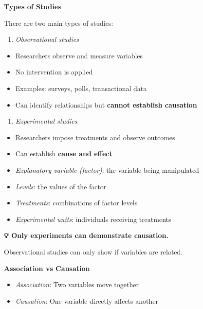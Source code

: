 \documentclass[
  11pt,
  oneside]{scrbook}
\providecommand{\tightlist}{%
  \setlength{\itemsep}{0pt}\setlength{\parskip}{0pt}}
\begin{document}
\textbf{Types of Studies}

There are two main types of studies:

\begin{enumerate}
\def\labelenumi{\arabic{enumi}.}
\tightlist
\item
  \emph{Observational studies}
\end{enumerate}

\begin{itemize}
\tightlist
\item
  Researchers observe and measure variables
\item
  No intervention is applied
\item
  Examples: surveys, polls, transactional data
\item
  Can identify relationships but \textbf{cannot establish causation}
\end{itemize}

\begin{enumerate}
\def\labelenumi{\arabic{enumi}.}
\setcounter{enumi}{1}
\tightlist
\item
  \emph{Experimental studies}
\end{enumerate}

\begin{itemize}
\tightlist
\item
  Researchers impose treatments and observe outcomes
\item
  Can establish \textbf{cause and effect}
\item
  \emph{Explanatory variable (factor)}: the variable being manipulated\\
\item
  \emph{Levels}: the values of the factor\\
\item
  \emph{Treatments}: combinations of factor levels\\
\item
  \emph{Experimental units}: individuals receiving treatments
\end{itemize}

\begin{tipbox}
\textbf{💡 Only experiments can demonstrate causation.}

Observational studies can only show if variables are related.
\end{tipbox}

\textbf{Association vs Causation}

\begin{itemize}
\tightlist
\item
  \emph{Association}: Two variables move together\\
\item
  \emph{Causation}: One variable directly affects another
\end{itemize}
\end{document}
